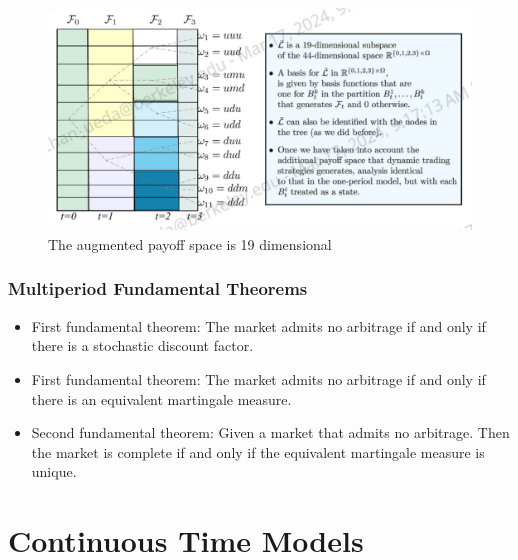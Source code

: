 \documentclass[11pt]{article}
\begin{document}
\begin{figure}[H] 
    \centering 
    \includegraphics[width=6in]{imgs/embedding.png}
    \caption{The augmented payoff space is 19 dimensional}
\end{figure}

\subsubsection{Multiperiod Fundamental Theorems}
\begin{itemize}
    \item First fundamental theorem: The market admits no arbitrage if and only if there is a 
    stochastic discount factor. 
    \item First fundamental theorem: The market admits no arbitrage if and only if there is an 
    equivalent martingale measure. 
    \item Second fundamental theorem: Given a market that admits no arbitrage. Then the market
    is complete if and only if the equivalent martingale measure is unique.
\end{itemize}

\section{Continuous Time Models}
\end{document}
